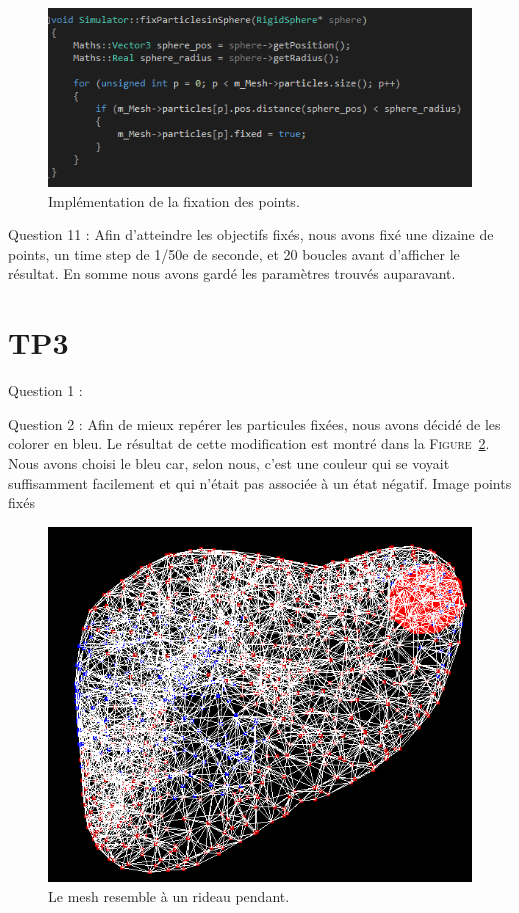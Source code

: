 \documentclass[a4paper,12pt]{article}
\begin{document}
\begin{figure}
  \centering
  \includegraphics{images/fixation_code.png}
  \caption{Implémentation de la fixation des points.}
  \label{fig:}
\end{figure}

Question 11 : Afin d'atteindre les objectifs fixés, nous avons fixé une dizaine de points, un time step de 1/50e de seconde, et 20 boucles avant d'afficher le résultat. En somme nous avons gardé les paramètres trouvés auparavant.

\section{TP3}

Question 1 :

Question 2 : Afin de mieux repérer les particules fixées, nous avons décidé de les colorer en bleu. Le résultat de cette modification est montré dans la \textsc{Figure}~\ref{fig:fixed}. Nous avons choisi le bleu car, selon nous, c'est une couleur qui se voyait suffisamment facilement et qui n'était pas associée à un état négatif.
 Image points fixés
\begin{figure}
  \centering
  \includegraphics{images/couleur_points_fixes.png}
  \caption{Le mesh resemble à un rideau pendant.}
  \label{fig:fixed}
\end{figure}
\end{document}
